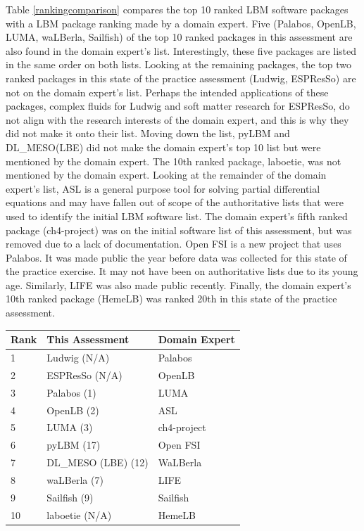 \documentclass[12pt, notitlepage]{article}
\begin{document}
Table \ref{rankingcomparison} compares the top 10 ranked LBM software packages with a LBM package ranking made by a domain expert. Five (Palabos, OpenLB, LUMA, waLBerla, Sailfish) of the top 10 ranked packages in this assessment are also found in the domain expert's list. Interestingly, these five packages are listed in the same order on both lists. Looking at the remaining packages, the top two ranked packages in this state of the practice assessment (Ludwig, ESPResSo) are not on the domain expert's list. Perhaps the intended applications of these packages, complex fluids for Ludwig and soft matter research for ESPResSo, do not align with the research interests of the domain expert, and this is why they did not make it onto their list. Moving down the list, pyLBM and DL\_MESO(LBE) did not make the domain expert's top 10 list but were mentioned by the domain expert. The 10th ranked package, laboetie, was not mentioned by the domain expert. Looking at the remainder of the domain expert's list, ASL is a general purpose tool for solving partial differential equations and may have fallen out of scope of the authoritative lists that were used to identify the initial LBM software list. The domain expert's fifth ranked package (ch4-project) was on the initial software list of this assessment, but was removed due to a lack of documentation. Open FSI is a new project that uses Palabos. It was made public the year before data was collected for this state of the practice exercise. It may not have been on authoritative lists due to its young age. Similarly, LIFE was also made public recently. Finally, the domain expert's 10th ranked package (HemeLB) was ranked 20th in this state of the practice assessment. 

\begin{center}
	\begin{onehalfspacing}
		\begin{tabular}{ p{2cm}p{4.5cm}p{3.5cm}}
			\hline
			Rank & This Assessment & Domain Expert\\
			\hline
			1&Ludwig (N/A) &Palabos\\
			2&ESPResSo (N/A) &OpenLB\\
			3&Palabos (1)&LUMA\\
			4&OpenLB (2)&ASL\\
			5&LUMA (3)&ch4-project\\
			6&pyLBM (17)&Open FSI\\
			7&DL\_MESO (LBE) (12)& WaLBerla\\
			8&waLBerla (7)& LIFE\\
			9&Sailfish (9)&Sailfish\\
			10&laboetie (N/A)&HemeLB\\		
			\hline
		\end{tabular}
		\label{rankingcomparison}
	\end{onehalfspacing}
\end{center}
\end{document}
